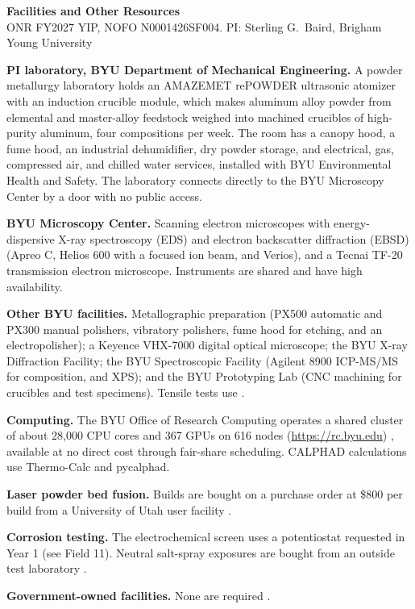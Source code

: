 

\begin{center}\textbf{Facilities and Other Resources}\\
ONR FY2027 YIP, NOFO N0001426SF004. PI: Sterling G.\ Baird, Brigham Young University\end{center}

\textbf{PI laboratory, BYU Department of Mechanical Engineering.} A powder
metallurgy laboratory  holds an AMAZEMET
rePOWDER ultrasonic atomizer with an induction crucible module, which makes
aluminum alloy powder from elemental and master-alloy feedstock weighed into
machined crucibles of high-purity aluminum, four compositions per week. The
room has a canopy hood, a fume hood, an industrial dehumidifier, dry powder
storage, and electrical, gas, compressed air, and chilled water services,
installed with BYU Environmental Health and Safety. The laboratory connects
directly to the BYU Microscopy Center by a door with no public access.

\textbf{BYU Microscopy Center.} Scanning electron microscopes with
energy-dispersive X-ray spectroscopy (EDS) and electron backscatter
diffraction (EBSD) (Apreo C, Helios 600 with a focused ion beam, and Verios), and a
Tecnai TF-20 transmission electron microscope. Instruments are shared and
have high availability.

\textbf{Other BYU facilities.} Metallographic preparation (PX500 automatic
and PX300 manual polishers, vibratory polishers, fume hood for etching, and
an electropolisher); a Keyence VHX-7000 digital optical microscope; the BYU
X-ray Diffraction Facility; the BYU Spectroscopic Facility (Agilent 8900
ICP-MS/MS for composition, and XPS); and the BYU Prototyping Lab (CNC
machining for crucibles and test specimens). Tensile tests use
.

\textbf{Computing.} The BYU Office of Research Computing operates a shared
cluster of about 28,000 CPU cores and 367 GPUs on 616 nodes
(\url{https://rc.byu.edu}) , available at no direct cost through fair-share
scheduling. CALPHAD calculations use Thermo-Calc  and pycalphad.

\textbf{Laser powder bed fusion.} Builds are bought on a purchase order at
\$800 per build from a University of Utah user facility .

\textbf{Corrosion testing.} The electrochemical screen uses a potentiostat
requested in Year 1 (see Field 11). Neutral salt-spray exposures are bought
from an outside test laboratory .

\textbf{Government-owned facilities.} None are required .


